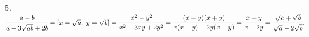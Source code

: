 5. $\cfrac{a-b}{a-3\sqrt{ab}+2b}=[x=\sqrt{a},\ y=\sqrt{b}]=\cfrac{x^2-y^2}{x^2-3xy+2y^2}=\cfrac{(x-y)(x+y)}{x(x-y)-2y(x-y)}=\cfrac{x+y}{x-2y}=\cfrac{\sqrt{a}+\sqrt{b}}{\sqrt{a}-2\sqrt{b}}.$\\
